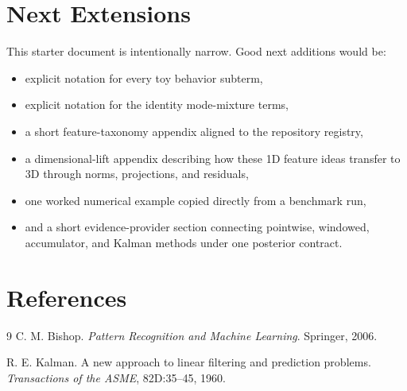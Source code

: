 \documentclass[11pt]{article}
\begin{document}
\section{Next Extensions}

This starter document is intentionally narrow. Good next additions would be:
\begin{itemize}[leftmargin=1.5em]
    \item explicit notation for every toy behavior subterm,
    \item explicit notation for the identity mode-mixture terms,
    \item a short feature-taxonomy appendix aligned to the repository registry,
    \item a dimensional-lift appendix describing how these 1D feature ideas
    transfer to 3D through norms, projections, and residuals,
    \item one worked numerical example copied directly from a benchmark run,
    \item and a short evidence-provider section connecting pointwise,
    windowed, accumulator, and Kalman methods under one posterior contract.
\end{itemize}

\section{References}
\begin{thebibliography}{9}
C. M. Bishop.
\newblock \emph{Pattern Recognition and Machine Learning}.
\newblock Springer, 2006.

R. E. Kalman.
\newblock A new approach to linear filtering and prediction problems.
\newblock \emph{Transactions of the ASME}, 82D:35--45, 1960.
\end{thebibliography}
\end{document}
